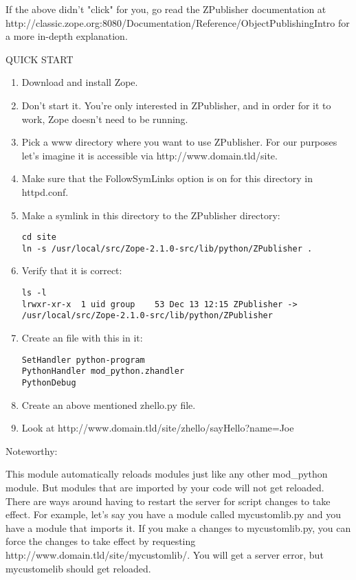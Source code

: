If the above didn't "click" for you, go read the ZPublisher
documentation at
http://classic.zope.org:8080/Documentation/Reference/ObjectPublishingIntro
for a more in-depth explanation.

QUICK START

\begin{enumerate}

\item
Download and install Zope. 

\item
Don't start it. You're only interested in ZPublisher, and in order for
it to work, Zope doesn't need to be running.

\item
Pick a www directory where you want to use ZPublisher. For our purposes
    let's imagine it is accessible via http://www.domain.tld/site. 

\item
Make sure that the FollowSymLinks option is on for this directory 
    in httpd.conf.

\item
Make a symlink in this directory to the ZPublisher directory:
\begin{verbatim}
cd site
ln -s /usr/local/src/Zope-2.1.0-src/lib/python/ZPublisher .
\end{verbatim}

\item
Verify that it is correct:
\begin{verbatim}
ls -l
lrwxr-xr-x  1 uid group    53 Dec 13 12:15 ZPublisher -> /usr/local/src/Zope-2.1.0-src/lib/python/ZPublisher
\end{verbatim}

\item
Create an  file with this in it:

\begin{verbatim}
SetHandler python-program
PythonHandler mod_python.zhandler
PythonDebug
\end{verbatim}

\item
Create an above mentioned zhello.py file.

\item
Look at http://www.domain.tld/site/zhello/sayHello?name=Joe

\end{enumerate}

Noteworthy:
 
This module automatically reloads modules just like any other
mod_python module. But modules that are imported by your code will not
get reloaded.  There are ways around having to restart the server for
script changes to take effect. For example, let's say you have a
module called mycustomlib.py and you have a module that imports it. If
you make a changes to mycustomlib.py, you can force the changes to
take effect by requesting http://www.domain.tld/site/mycustomlib/.
You will get a server error, but mycustomelib should get reloaded.
 
